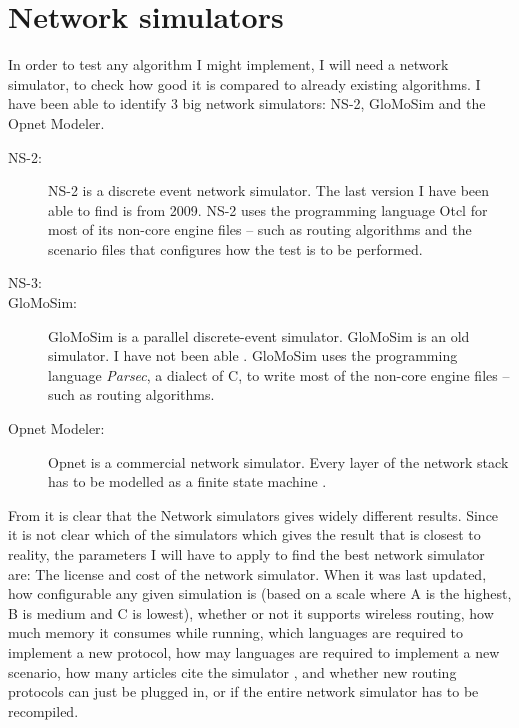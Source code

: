\section{Network simulators}

In order to test any algorithm I might implement, I will need a network simulator, to check how good it is compared to already existing algorithms. I have been able to identify 3 big network simulators: NS-2, GloMoSim and the Opnet Modeler.

\begin{description}
\item[NS-2:] NS-2 is a discrete event network simulator. The last version I have been able to find is from 2009. NS-2 uses the programming language Otcl for most of its non-core engine files -- such as routing algorithms and the scenario files that configures how the test is to be performed.
\item[NS-3:]
\item[GloMoSim:] GloMoSim is a parallel discrete-event simulator. GloMoSim is an old simulator. I have not been able   . GloMoSim uses the programming language \emph{Parsec}, a dialect of C, to write most of the non-core engine files -- such as routing algorithms. 
\item[Opnet Modeler:] Opnet is a commercial network simulator. Every layer of the network stack has to be modelled as a finite state machine \cite{MANcom}.
\end{description}

From \cite{MANcom} it is clear that the Network simulators gives widely different results. Since it is not clear which of the simulators which gives the result that is closest to reality, the parameters I will have to apply to find the best network simulator are: The license and cost of the network simulator. When it was last updated, how configurable any given simulation is (based on a scale where A is the highest, B is medium and C is lowest), whether or not it supports wireless routing, how much memory it consumes while running, which languages are required to implement a new protocol, how may languages are required to implement a new scenario, how many articles cite the simulator , and whether new routing protocols can just be plugged in, or if the entire network simulator has to be recompiled.

